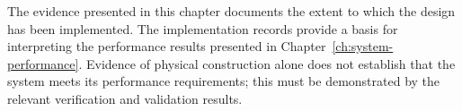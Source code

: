 


The evidence presented in this chapter documents the extent to
which the design has been implemented. The implementation records
provide a basis for interpreting the performance results presented
in Chapter~\ref{ch:system-performance}. Evidence of physical
construction alone does not establish that the system meets its
performance requirements; this must be demonstrated by the
relevant verification and validation results.
